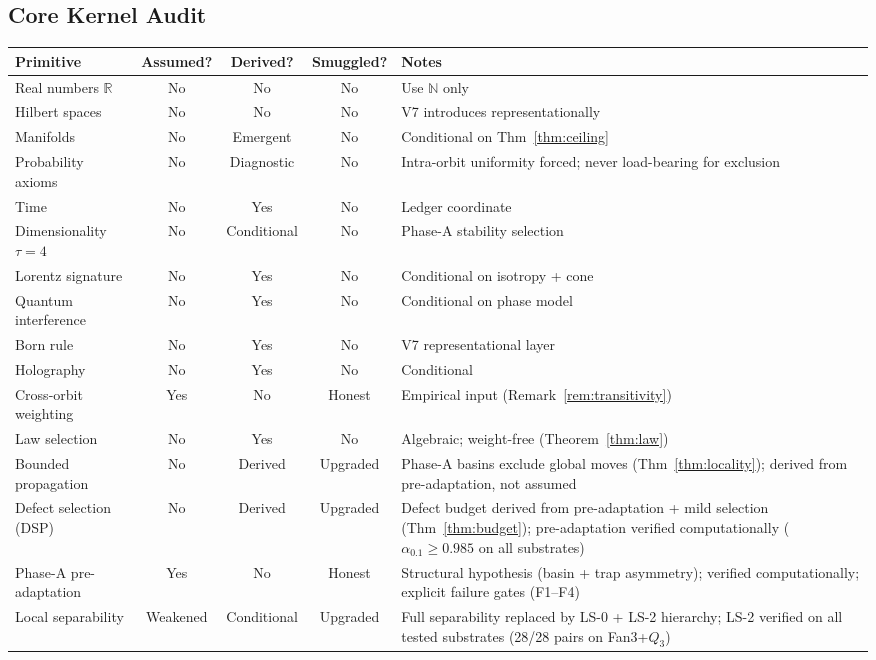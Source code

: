 \documentclass[11pt,a4paper]{article}
\theoremstyle{definition}
\theoremstyle{remark}
\begin{document}
\subsection{Core Kernel Audit}

\begin{center}
\begin{tabular}{lcccp{4.5cm}}
\toprule
\textbf{Primitive} & \textbf{Assumed?} & \textbf{Derived?} & \textbf{Smuggled?} & \textbf{Notes} \\
\midrule
Real numbers $\mathbb{R}$ & No & No & No & Use $\mathbb{N}$ only \\
Hilbert spaces & No & No & No & V7 introduces representationally \\
Manifolds & No & Emergent & No & Conditional on Thm~\ref{thm:ceiling} \\
Probability axioms & No & Diagnostic & No & Intra-orbit uniformity forced; never load-bearing for exclusion \\
Time & No & Yes & No & Ledger coordinate \\
Dimensionality $\tau{=}4$ & No & Conditional & No & Phase-A stability selection \\
Lorentz signature & No & Yes & No & Conditional on isotropy + cone \\
Quantum interference & No & Yes & No & Conditional on phase model \\
Born rule & No & Yes & No & V7 representational layer \\
Holography & No & Yes & No & Conditional \\
Cross-orbit weighting & Yes & No & Honest & Empirical input (Remark~\ref{rem:transitivity}) \\
Law selection & No & Yes & No & Algebraic; weight-free (Theorem~\ref{thm:law}) \\
Bounded propagation & No & Derived & Upgraded & Phase-A basins exclude global moves (Thm~\ref{thm:locality}); derived from pre-adaptation, not assumed \\
Defect selection (DSP) & No & Derived & Upgraded & Defect budget derived from pre-adaptation + mild selection (Thm~\ref{thm:budget}); pre-adaptation verified computationally ($\alpha_{0.1} \geq 0.985$ on all substrates) \\
Phase-A pre-adaptation & Yes & No & Honest & Structural hypothesis (basin + trap asymmetry); verified computationally; explicit failure gates (F1--F4) \\
Local separability & Weakened & Conditional & Upgraded & Full separability replaced by LS-0 + LS-2 hierarchy; LS-2 verified on all tested substrates (28/28 pairs on Fan3+$Q_3$) \\

\end{tabular}
\end{center}
\end{document}

